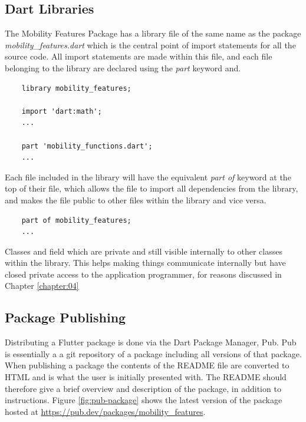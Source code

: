 \subsection{Dart Libraries}
The Mobility Features Package has a library file of the same name as the package \textit{mobility\_features.dart} which is the central point of import statements for all the source code. All import statements are made within this file, and each file belonging to the library are declared using the \textit{part} keyword and. 

\begin{verbatim}
    library mobility_features;
    
    import 'dart:math';
    ...
    
    part 'mobility_functions.dart';
    ...
\end{verbatim}

Each file included in the library will have the equivalent \textit{part of} keyword at the top of their file, which allows the file to import all dependencies from the library, and makes the file public to other files within the library and vice versa.

\begin{verbatim}
    part of mobility_features;
    ...
\end{verbatim}

Classes and field which are private and still visible internally to other classes within the library. This helps making things communicate internally but have closed private access to the application programmer, for reasons discussed in Chapter \ref{chapter:04}

\subsection{Package Publishing}
Distributing a Flutter package is done via the Dart Package Manager, Pub. Pub is essentially a a git repository of a package including all versions of that package. When publishing a package the contents of the README file are converted to HTML and is what the user is initially presented with. The README should therefore give a brief overview and description of the package, in addition to instructions. Figure \ref{fig:pub-package} shows the latest version of the package hosted at \url{https://pub.dev/packages/mobility_features}.

